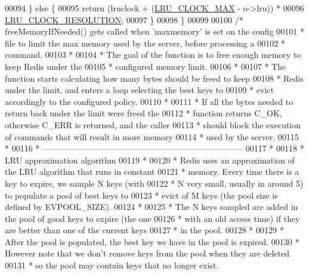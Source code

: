 \begin{DoxyCode}
00094     \} \textcolor{keywordflow}{else} \{
00095         \textcolor{keywordflow}{return} (lruclock + (\hyperlink{server_8h_a39e838b26cf6677ae57950f45a45f1b2}{LRU\_CLOCK\_MAX} - o->lru)) *
00096                     \hyperlink{server_8h_ace9135e475fa92a1d52f0c5782687efe}{LRU\_CLOCK\_RESOLUTION};
00097     \}
00098 \}
00099 
00100 \textcolor{comment}{/* freeMemoryIfNeeded() gets called when 'maxmemory' is set on the config}
00101 \textcolor{comment}{ * file to limit the max memory used by the server, before processing a}
00102 \textcolor{comment}{ * command.}
00103 \textcolor{comment}{ *}
00104 \textcolor{comment}{ * The goal of the function is to free enough memory to keep Redis under the}
00105 \textcolor{comment}{ * configured memory limit.}
00106 \textcolor{comment}{ *}
00107 \textcolor{comment}{ * The function starts calculating how many bytes should be freed to keep}
00108 \textcolor{comment}{ * Redis under the limit, and enters a loop selecting the best keys to}
00109 \textcolor{comment}{ * evict accordingly to the configured policy.}
00110 \textcolor{comment}{ *}
00111 \textcolor{comment}{ * If all the bytes needed to return back under the limit were freed the}
00112 \textcolor{comment}{ * function returns C\_OK, otherwise C\_ERR is returned, and the caller}
00113 \textcolor{comment}{ * should block the execution of commands that will result in more memory}
00114 \textcolor{comment}{ * used by the server.}
00115 \textcolor{comment}{ *}
00116 \textcolor{comment}{ * ------------------------------------------------------------------------}
00117 \textcolor{comment}{ *}
00118 \textcolor{comment}{ * LRU approximation algorithm}
00119 \textcolor{comment}{ *}
00120 \textcolor{comment}{ * Redis uses an approximation of the LRU algorithm that runs in constant}
00121 \textcolor{comment}{ * memory. Every time there is a key to expire, we sample N keys (with}
00122 \textcolor{comment}{ * N very small, usually in around 5) to populate a pool of best keys to}
00123 \textcolor{comment}{ * evict of M keys (the pool size is defined by EVPOOL\_SIZE).}
00124 \textcolor{comment}{ *}
00125 \textcolor{comment}{ * The N keys sampled are added in the pool of good keys to expire (the one}
00126 \textcolor{comment}{ * with an old access time) if they are better than one of the current keys}
00127 \textcolor{comment}{ * in the pool.}
00128 \textcolor{comment}{ *}
00129 \textcolor{comment}{ * After the pool is populated, the best key we have in the pool is expired.}
00130 \textcolor{comment}{ * However note that we don't remove keys from the pool when they are deleted}
00131 \textcolor{comment}{ * so the pool may contain keys that no longer exist.}

\end{DoxyCode}
